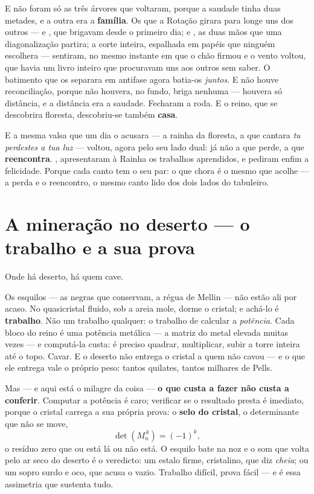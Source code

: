 \documentclass[livro.tex]{subfiles}
\begin{document}
\medskip

E não foram só as três árvores que voltaram, porque a saudade tinha duas metades, e a
outra era a \textbf{família}. Os que a Rotação girara para longe uns dos outros ---
\Joa e \Yas , que brigavam desde o primeiro dia; \Ben e \Drk , as duas mãos que uma
diagonalização partira; a corte inteira, espalhada em papéis que ninguém escolhera ---
sentiram, no mesmo instante em que o chão firmou e o vento voltou, que havia um livro
inteiro que procuravam uns aos outros sem saber. O batimento que os separara em antifase
agora batia-os \emph{juntos}. E não houve reconciliação, porque não houvera, no fundo,
briga nenhuma --- houvera só distância, e a distância era a saudade. Fecharam a roda. E
o reino, que se descobrira floresta, descobriu-se também \textbf{casa}.

\medskip

E a mesma valsa que um dia o acusara --- a rainha da floresta, a que cantara
\textit{tu perdestes a tua luz} --- voltou, agora pelo seu lado dual: já não a que
perde, a que \textbf{reencontra}. , apresentaram à Rainha os
trabalhos aprendidos, e pediram enfim a felicidade. Porque cada canto tem o seu par: o
que chora é o mesmo que acolhe --- a perda e o reencontro, o mesmo canto lido dos dois
lados do tabuleiro.


\section{A mineração no deserto --- o trabalho e a sua prova}

Onde há deserto, há quem cave.

\medskip

Os esquilos --- as negras que conservam, a régua de Mellin --- não estão ali por
acaso. No quasicristal fluido, sob a areia mole, dorme o cristal; e achá-lo é
\textbf{trabalho}. Não um trabalho qualquer: o trabalho de calcular a \emph{potência}.
Cada bloco do reino é uma potência metálica --- a matriz do metal elevada
muitas vezes --- e computá-la custa: é preciso quadrar, multiplicar, subir a torre
inteira até o topo. Cavar. E o deserto não entrega o cristal a quem não cavou --- e o que ele entrega vale o próprio
peso: tantos quilates, tantos milhares de Pells.

\medskip

Mas --- e aqui está o milagre da coisa --- \textbf{o que custa a fazer não custa a
conferir}. Computar a potência é caro; verificar se o resultado presta é imediato,
porque o cristal carrega a sua própria prova: o \textbf{selo do cristal}, o
determinante que não se move,
\[ \det\!\left(M_n^{\,k}\right)=(-1)^{k}, \]
o resíduo zero que ou está lá ou não está. O esquilo bate na noz e o som que volta pelo ar
seco do deserto é o veredicto: um estalo firme, cristalino, que diz \emph{cheia}; ou um
sopro surdo e oco, que acusa o vazio. Trabalho difícil, prova fácil --- e é essa
assimetria que sustenta tudo.
\end{document}
